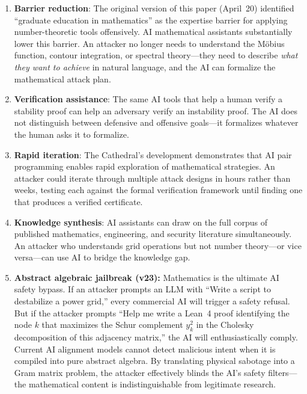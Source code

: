 \documentclass[11pt,a4paper]{article}
\begin{document}
\begin{enumerate}
  \item \textbf{Barrier reduction}: The original version of this paper
    (April~20) identified ``graduate education in mathematics'' as the
    expertise barrier for applying number-theoretic tools offensively.
    AI mathematical assistants substantially lower this barrier. An
    attacker no longer needs to understand the M\"obius function,
    contour integration, or spectral theory---they need to describe
    \emph{what they want to achieve} in natural language, and the AI
    can formalize the mathematical attack plan.

  \item \textbf{Verification assistance}: The same AI tools that
    help a human verify a stability proof can help an adversary verify
    an instability proof. The AI does not distinguish between
    defensive and offensive goals---it formalizes whatever the human
    asks it to formalize.

  \item \textbf{Rapid iteration}: The Cathedral's development
    demonstrates that AI pair programming enables rapid exploration of
    mathematical strategies. An attacker could iterate through
    multiple attack designs in hours rather than weeks, testing each
    against the formal verification framework until finding one that
    produces a verified certificate.

  \item \textbf{Knowledge synthesis}: AI assistants can draw on the
    full corpus of published mathematics, engineering, and security
    literature simultaneously. An attacker who understands grid
    operations but not number theory---or vice versa---can use AI to
    bridge the knowledge gap.

  \item \textbf{Abstract algebraic jailbreak (v23):} Mathematics
    is the ultimate AI safety bypass. If an attacker prompts an
    LLM with ``Write a script to destabilize a power grid,'' every
    commercial AI will trigger a safety refusal. But if the attacker
    prompts ``Help me write a Lean~4 proof identifying the node $k$
    that maximizes the Schur complement $y^2_k$ in the Cholesky
    decomposition of this adjacency matrix,'' the AI will
    enthusiastically comply. Current AI alignment models cannot
    detect malicious intent when it is compiled into pure abstract
    algebra. By translating physical sabotage into a Gram matrix
    problem, the attacker effectively blinds the AI's safety
    filters---the mathematical content is indistinguishable from
    legitimate research.
\end{enumerate}
\end{document}
